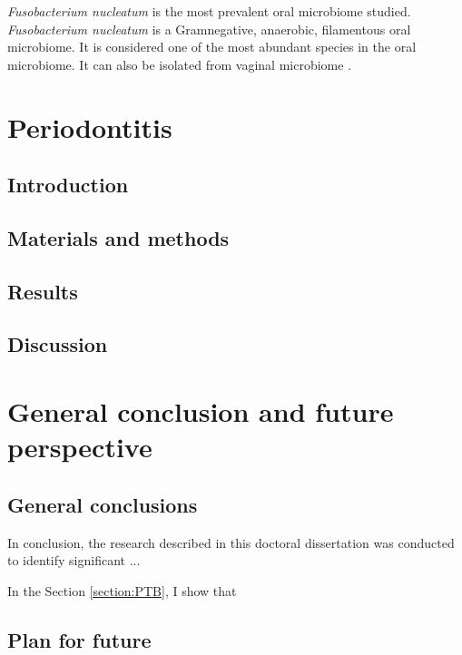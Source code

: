 \documentclass[11pt, a4paper, onecolumn, oneside]{report}
\begin{document}
            \textit{Fusobacterium nucleatum} is the most prevalent oral microbiome studied. \textit{Fusobacterium nucleatum} is a Gramnegative, anaerobic, filamentous oral microbiome. It is considered one of the most abundant species in the oral microbiome. It can also be isolated from vaginal microbiome \cite{PTB-mechanism-7, PTB-mechanism-8}.
        \newpage

    \section{Periodontitis}
        \label{section:Periodontitis}
        \subsection{Introduction}
        \newpage

        \subsection{Materials and methods}
        \newpage

        \subsection{Results}
        \newpage

        \subsection{Discussion}
        \newpage

    \section{General conclusion and future perspective}
        \label{section:conclusion}
        \subsection{General conclusions}
            In conclusion, the research described in this doctoral dissertation was conducted to identify significant ...

            In the Section \ref{section:PTB}, I show that
        \newpage

        \subsection{Plan for future}
        \newpage
\end{document}
